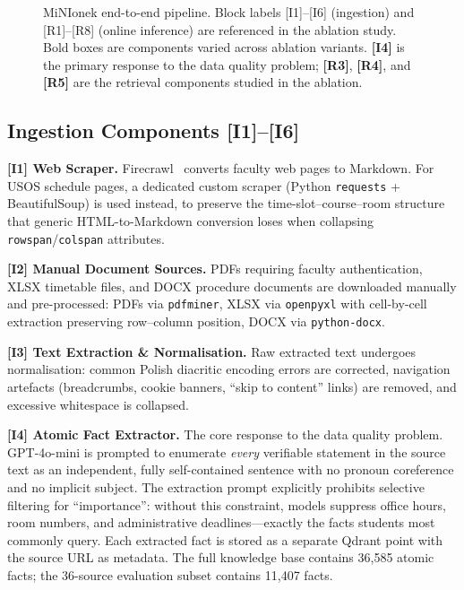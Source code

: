 \documentclass[sigconf,natbib=true]{acmart}
\begin{document}
\begin{figure}[t]
\caption{MiNIonek end-to-end pipeline. Block labels [I1]--[I6] (ingestion) and [R1]--[R8] (online inference) are referenced in the ablation study. Bold boxes are components varied across ablation variants. \textbf{[I4]} is the primary response to the data quality problem; \textbf{[R3]}, \textbf{[R4]}, and \textbf{[R5]} are the retrieval components studied in the ablation.}
\label{fig:architecture}
\end{figure}

\subsection{Ingestion Components [I1]--[I6]}

\textbf{[I1] Web Scraper.}
Firecrawl~\cite{firecrawl} converts faculty web pages to Markdown.
For USOS schedule pages, a dedicated custom scraper (Python \texttt{requests} + BeautifulSoup) is used instead, to preserve the time-slot--course--room structure that generic HTML-to-Markdown conversion loses when collapsing \texttt{rowspan}/\texttt{colspan} attributes.

\textbf{[I2] Manual Document Sources.}
PDFs requiring faculty authentication, XLSX timetable files, and DOCX procedure documents are downloaded manually and pre-processed: PDFs via \texttt{pdfminer}, XLSX via \texttt{openpyxl} with cell-by-cell extraction preserving row--column position, DOCX via \texttt{python-docx}.

\textbf{[I3] Text Extraction \& Normalisation.}
Raw extracted text undergoes normalisation: common Polish diacritic encoding errors are corrected, navigation artefacts (breadcrumbs, cookie banners, ``skip to content'' links) are removed, and excessive whitespace is collapsed.

\textbf{[I4] Atomic Fact Extractor.}
The core response to the data quality problem.
GPT-4o-mini is prompted to enumerate \emph{every} verifiable statement in the source text as an independent, fully self-contained sentence with no pronoun coreference and no implicit subject.
The extraction prompt explicitly prohibits selective filtering for ``importance'': without this constraint, models suppress office hours, room numbers, and administrative deadlines---exactly the facts students most commonly query.
Each extracted fact is stored as a separate Qdrant point with the source URL as metadata.
The full knowledge base contains 36{,}585 atomic facts; the 36-source evaluation subset contains 11{,}407 facts.
\end{document}
